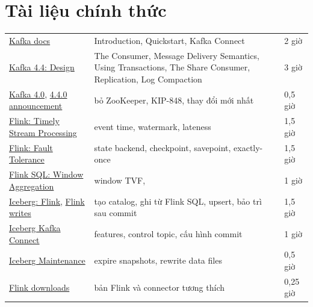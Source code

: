 \section{Tài liệu chính thức}
\begin{xltabular}{\textwidth}{@{}P{4.2cm} L P{1.8cm}@{}}
\toprule
{} &  &  \\
\midrule
\endhead
\bottomrule
\endfoot
\href{https://kafka.apache.org/documentation/}{Kafka docs} & Introduction, Quickstart, Kafka Connect & 2 giờ \\
\href{https://kafka.apache.org/44/design/design/}{Kafka 4.4: Design} & The Consumer, Message Delivery Semantics, Using Transactions, The Share Consumer, Replication, Log Compaction & 3 giờ \\
\href{https://kafka.apache.org/blog/2025/03/18/apache-kafka-4.0.0-release-announcement/}{Kafka 4.0}, \href{https://kafka.apache.org/blog/2026/10/22/apache-kafka-4.4.0-release-announcement/}{4.4.0 announcement} & bỏ ZooKeeper, KIP-848, thay đổi mới nhất & 0,5 giờ \\
\href{https://nightlies.apache.org/flink/flink-docs-stable/docs/concepts/time/}{Flink: Timely Stream Processing} & event time, watermark, lateness & 1,5 giờ \\
\href{https://nightlies.apache.org/flink/flink-docs-stable/docs/learn-flink/fault_tolerance/}{Flink: Fault Tolerance} & state backend, checkpoint, savepoint, exactly-once & 1,5 giờ \\
\href{https://nightlies.apache.org/flink/flink-docs-stable/docs/sql/reference/queries/window-agg/}{Flink SQL: Window Aggregation} & window TVF,  & 1 giờ \\
\href{https://iceberg.apache.org/docs/latest/flink/}{Iceberg: Flink}, \href{https://iceberg.apache.org/docs/latest/flink-writes/}{Flink writes} & tạo catalog, ghi từ Flink SQL, upsert, bảo trì sau commit & 1,5 giờ \\
\href{https://iceberg.apache.org/docs/latest/kafka-connect/}{Iceberg Kafka Connect} & features, control topic, cấu hình commit & 1 giờ \\
\href{https://iceberg.apache.org/docs/latest/maintenance/}{Iceberg Maintenance} & expire snapshots, rewrite data files & 0,5 giờ \\
\href{https://flink.apache.org/downloads/}{Flink downloads} & bản Flink và connector tương thích & 0,25 giờ \\
\end{xltabular}

